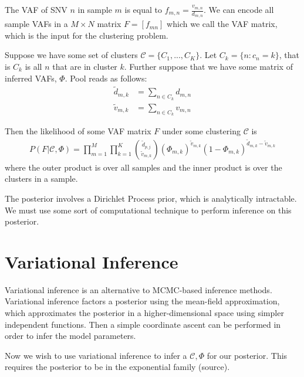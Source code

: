 \documentclass[11pt]{article}
\begin{document}
The VAF of SNV $n$ in sample $m$ is equal to $f_{m,n} = \frac{v_{m,n}}{d_{m,n}}$. We can encode all sample VAFs in a $M \times N$ matrix $F = [f_{mn}]$ which we call the VAF matrix, which is the input for the clustering problem.

\newpage

Suppose we have some set of clusters $\mathcal{C}=\{C_1, ..., C_K\}$. Let $C_k = \{n: c_n = k\}$, that is $C_k$ is all $n$ that are in cluster $k$. Further suppose that we have some matrix of inferred VAFs, $\Phi$. Pool reads as follows:
\begin{align}
\widetilde{d}_{m,k} &= \sum\limits_{n \in C_k} d_{m,n} \\
\widetilde{v}_{m,k} &= \sum\limits_{n \in C_k} v_{m,n}
\end{align}

Then the likelihood of some VAF matrix $F$  under some clustering $\mathcal{C}$ is
\begin{align}
P(F|\mathcal{C}, \Phi) = \prod\limits_{m=1}^M \prod\limits_{k=1}^K\binom{\widetilde{d}_{p,j}}{\widetilde{v}_{m,k}} \left({\Phi}_{m,k}\right)^{\widetilde{v}_{m,k}} \left(1 - \Phi_{m,k}\right)^{\widetilde{d}_{m,k} - \widetilde{v}_{m,k}}
\end{align}
where the outer product is over all samples and the inner product is over the clusters in a sample.

The posterior involves a Dirichlet Process prior, which is analytically intractable. We must use some sort of computational technique to perform inference on this posterior.

\section{Variational Inference}

Variational inference is an alternative to MCMC-based inference methods. Variational inference factors a posterior using the mean-field approximation, which approximates the posterior in a higher-dimensional space using simpler independent functions. Then a simple coordinate ascent can be performed in order to infer the model parameters.

Now we wish to use variational inference to infer a $\mathcal{C}, \Phi$ for our posterior. This requires the posterior to be in the exponential family (source).
\end{document}
